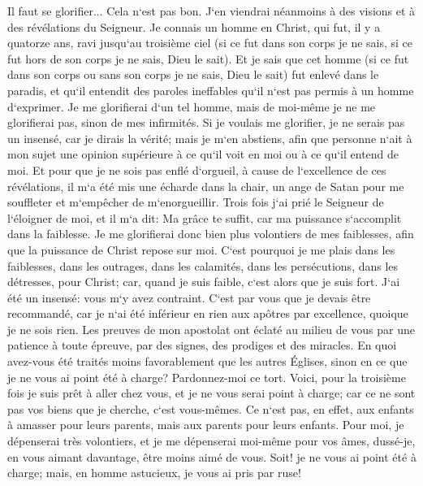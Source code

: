 \verse Il faut se glorifier... Cela n`est pas bon. J`en viendrai néanmoins à des visions et à des révélations du Seigneur. 
\verse Je connais un homme en Christ, qui fut, il y a quatorze ans, ravi jusqu`au troisième ciel (si ce fut dans son corps je ne sais, si ce fut hors de son corps je ne sais, Dieu le sait). 
\verse Et je sais que cet homme (si ce fut dans son corps ou sans son corps je ne sais, Dieu le sait) 
\verse fut enlevé dans le paradis, et qu`il entendit des paroles ineffables qu`il n`est pas permis à un homme d`exprimer. 
\verse Je me glorifierai d`un tel homme, mais de moi-même je ne me glorifierai pas, sinon de mes infirmités. 
\verse Si je voulais me glorifier, je ne serais pas un insensé, car je dirais la vérité; mais je m`en abstiens, afin que personne n`ait à mon sujet une opinion supérieure à ce qu`il voit en moi ou à ce qu`il entend de moi. 
\verse Et pour que je ne sois pas enflé d`orgueil, à cause de l`excellence de ces révélations, il m`a été mis une écharde dans la chair, un ange de Satan pour me souffleter et m`empêcher de m`enorgueillir. 
\verse Trois fois j`ai prié le Seigneur de l`éloigner de moi, 
\verse et il m`a dit: Ma grâce te suffit, car ma puissance s`accomplit dans la faiblesse. Je me glorifierai donc bien plus volontiers de mes faiblesses, afin que la puissance de Christ repose sur moi. 
\verse C`est pourquoi je me plais dans les faiblesses, dans les outrages, dans les calamités, dans les persécutions, dans les détresses, pour Christ; car, quand je suis faible, c`est alors que je suis fort. 
\verse J`ai été un insensé: vous m`y avez contraint. C`est par vous que je devais être recommandé, car je n`ai été inférieur en rien aux apôtres par excellence, quoique je ne sois rien. 
\verse Les preuves de mon apostolat ont éclaté au milieu de vous par une patience à toute épreuve, par des signes, des prodiges et des miracles. 
\verse En quoi avez-vous été traités moins favorablement que les autres Églises, sinon en ce que je ne vous ai point été à charge? Pardonnez-moi ce tort. 
\verse Voici, pour la troisième fois je suis prêt à aller chez vous, et je ne vous serai point à charge; car ce ne sont pas vos biens que je cherche, c`est vous-mêmes. Ce n`est pas, en effet, aux enfants à amasser pour leurs parents, mais aux parents pour leurs enfants. 
\verse Pour moi, je dépenserai très volontiers, et je me dépenserai moi-même pour vos âmes, dussé-je, en vous aimant davantage, être moins aimé de vous. 
\verse Soit! je ne vous ai point été à charge; mais, en homme astucieux, je vous ai pris par ruse! 

